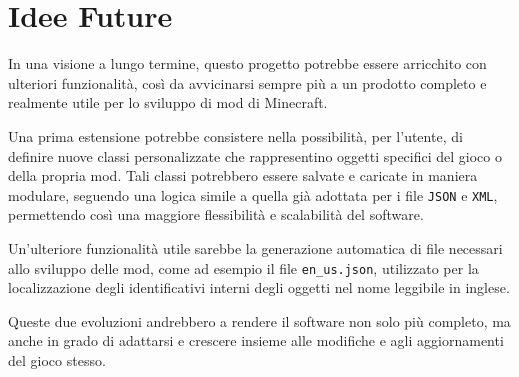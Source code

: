 \documentclass[12pt]{article}
\begin{document}
\section{Idee Future}

In una visione a lungo termine, questo progetto potrebbe essere arricchito con ulteriori funzionalità, così da avvicinarsi sempre più a un prodotto completo e realmente utile per lo sviluppo di mod di Minecraft.

Una prima estensione potrebbe consistere nella possibilità, per l'utente, di definire nuove classi personalizzate che rappresentino oggetti specifici del gioco o della propria mod. Tali classi potrebbero essere salvate e caricate in maniera modulare, seguendo una logica simile a quella già adottata per i file \texttt{JSON} e \texttt{XML}, permettendo così una maggiore flessibilità e scalabilità del software.

Un’ulteriore funzionalità utile sarebbe la generazione automatica di file necessari allo sviluppo delle mod, come ad esempio il file \texttt{en\_us.json}, utilizzato per la localizzazione degli identificativi interni degli oggetti nel nome leggibile in inglese.

Queste due evoluzioni andrebbero a rendere il software non solo più completo, ma anche in grado di adattarsi e crescere insieme alle modifiche e agli aggiornamenti del gioco stesso.
\end{document}
